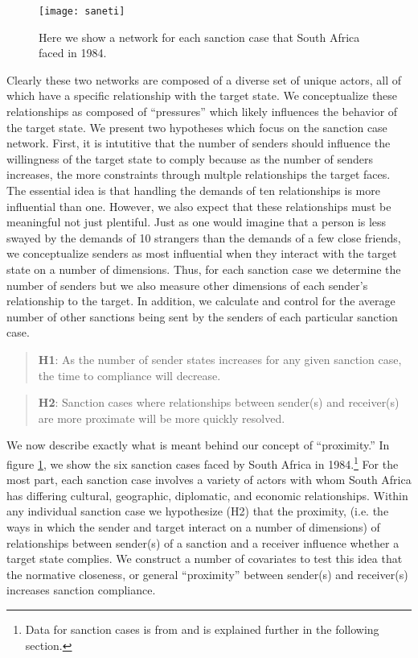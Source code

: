\begin{figure}[ht]
	\centering
	\texttt{[image: saneti]}
	\caption{Here we show a network for each sanction case that South Africa faced in 1984.}
	\label{fig:saneti}
\end{figure}
\FloatBarrier

Clearly these two networks are composed of a diverse set of unique actors, all of which have a specific relationship with the target state. We conceptualize these relationships as composed of ``pressures'' which likely influences the behavior of the target state. We present two hypotheses which focus on the sanction case network. First, it is intutitive that the number of senders should influence the willingness of the target state to comply because as the number of senders increases, the more constraints through multple relationships the target faces. The essential idea is that handling the demands of ten relationships is more influential than one. However, we also expect that these relationships must be meaningful not just plentiful. Just as one would imagine that a person is less swayed by the demands of 10 strangers than the demands of a few close friends, we conceptualize senders as most influential when they interact with the target state on a number of dimensions.  Thus, for each sanction case we determine the number of senders but we also measure other dimensions of each sender's relationship to the target. In addition, we calculate and control for the average number of other sanctions being sent by the senders of each particular sanction case.

\begin{quote}
	\textbf{H1}: As the number of sender states increases for any given sanction case, the time to compliance will decrease. 
\end{quote}

\begin{quote}
	\textbf{H2}: Sanction cases where relationships between sender(s) and receiver(s) are more proximate will be more quickly resolved.
\end{quote}

 We now describe exactly what is meant behind our concept of ``proximity.'' In figure \ref{fig:saneti}, we show the six sanction cases faced by South Africa in 1984.\footnote{Data for sanction cases is from \citet{morgan2009threat} and is explained further in the following section.} For the most part, each sanction case involves a variety of actors with whom South Africa has differing cultural, geographic, diplomatic, and economic relationships. Within any individual sanction case we hypothesize (H2) that the proximity, (i.e. the ways in which the sender and target interact on a number of dimensions) of relationships between sender(s) of a sanction and a receiver influence whether a target state complies. We construct a number of covariates to test this idea that the normative closeness, or general ``proximity'' between sender(s) and receiver(s) increases sanction compliance. 

